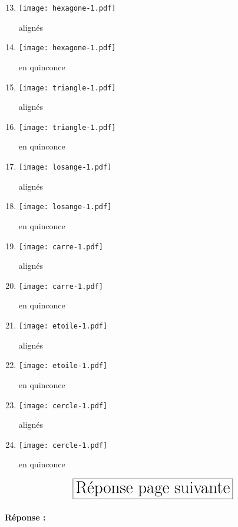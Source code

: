 \documentclass[11pt,a4paper]{article}
\begin{document}
\begin{minipage}[t]{7cm}
\begin{enumerate}\setcounter{enumi}{12}
\item \begin{minipage}{1.75cm}\texttt{[image: hexagone-1.pdf]}\end{minipage} alignés
\item \begin{minipage}{1.75cm}\texttt{[image: hexagone-1.pdf]}\end{minipage} en quinconce
\item \begin{minipage}{1.75cm}\texttt{[image: triangle-1.pdf]}\end{minipage} alignés
\item \begin{minipage}{1.75cm}\texttt{[image: triangle-1.pdf]}\end{minipage} en quinconce
\item \begin{minipage}{1.75cm}\texttt{[image: losange-1.pdf]}\end{minipage} alignés
\item \begin{minipage}{1.75cm}\texttt{[image: losange-1.pdf]}\end{minipage} en quinconce
\item \begin{minipage}{1.75cm}\texttt{[image: carre-1.pdf]}\end{minipage} alignés
\item \begin{minipage}{1.75cm}\texttt{[image: carre-1.pdf]}\end{minipage} en quinconce
\item \begin{minipage}{1.75cm}\texttt{[image: etoile-1.pdf]}\end{minipage} alignés
\item \begin{minipage}{1.75cm}\texttt{[image: etoile-1.pdf]}\end{minipage} en quinconce
\item \begin{minipage}{1.75cm}\texttt{[image: cercle-1.pdf]}\end{minipage} alignés
\item \begin{minipage}{1.75cm}\texttt{[image: cercle-1.pdf]}\end{minipage} en quinconce
\end{enumerate}
\end{minipage}
\null\vfill

$$\reponse$$
\paragraph{Réponse :}\mbox{}

\noindent\framebox[\textwidth]{$\rule{0cm}{0.96\textheight}$}



\end{document}
